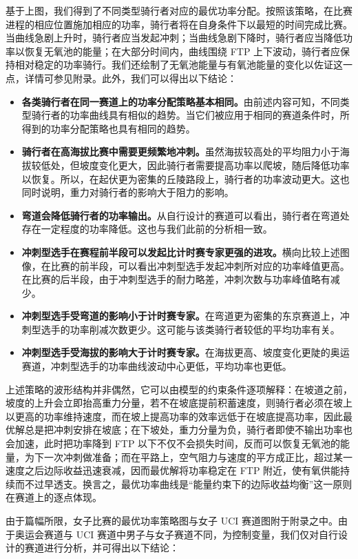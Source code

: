 \documentclass[11pt,a4paper]{ctexart}
\begin{document}
基于上图，我们得到了不同类型骑行者对应的最优功率分配。按照该策略，在比赛进程的相应位置施加相应的功率，骑行者将在自身条件下以最短的时间完成比赛。当曲线急剧上升时，骑行者应当发起冲刺；当曲线急剧下降时，骑行者应当降低功率以恢复无氧池的能量；在大部分时间内，曲线围绕 FTP 上下波动，骑行者应保持相对稳定的功率骑行。我们还绘制了无氧池能量与有氧池能量的变化以佐证这一点，详情可参见附录。此外，我们可以得出以下结论：
\begin{itemize}
\item \textbf{各类骑行者在同一赛道上的功率分配策略基本相同。}由前述内容可知，不同类型骑行者的功率曲线具有相似的趋势。当它们被应用于相同的赛道条件时，所得到的功率分配策略也具有相同的趋势。
\item \textbf{骑行者在高海拔比赛中需要更频繁地冲刺。}虽然海拔较高处的平均阻力小于海拔较低处，但坡度变化更大，因此骑行者需要提高功率以爬坡，随后降低功率以恢复。所以，在起伏更为密集的丘陵路段上，骑行者的功率波动更大。这也同时说明，重力对骑行者的影响大于阻力的影响。
\item \textbf{弯道会降低骑行者的功率输出。}从自行设计的赛道可以看出，骑行者在弯道处存在一定程度的功率降低。这也与我们此前的分析相一致。
\item \textbf{冲刺型选手在赛程前半段可以发起比计时赛专家更强的进攻。}横向比较上述图像，在比赛的前半段，可以看出冲刺型选手发起冲刺所对应的功率峰值更高。在比赛的后半段，由于冲刺型选手的耐力略差，冲刺次数与功率峰值略有减少。
\item \textbf{冲刺型选手受弯道的影响小于计时赛专家。}在弯道更为密集的东京赛道上，冲刺型选手的功率削减次数更少。这可能与该类骑行者较低的平均功率有关。
\item \textbf{冲刺型选手受海拔的影响大于计时赛专家。}在海拔更高、坡度变化更陡的奥运赛道，冲刺型选手的功率曲线波动中心更低，平均功率也更低。
\end{itemize}

上述策略的波形结构并非偶然，它可以由模型的约束条件逐项解释：在坡道之前，坡度的上升会立即抬高重力分量，若不在坡底提前积蓄速度，则骑行者必须在坡上以更高的功率维持速度，而在坡上提高功率的效率远低于在坡底提高功率，因此最优解总是把冲刺安排在坡底；在下坡处，重力分量为负，骑行者即使不输出功率也会加速，此时把功率降到 FTP 以下不仅不会损失时间，反而可以恢复无氧池的能量，为下一次冲刺做准备；而在平路上，空气阻力与速度的平方成正比，超过某一速度之后边际收益迅速衰减，因而最优解将功率稳定在 FTP 附近，使有氧供能持续而不过早透支。换言之，最优功率曲线是“能量约束下的边际收益均衡”这一原则在赛道上的逐点体现。

由于篇幅所限，女子比赛的最优功率策略图与女子 UCI 赛道图附于附录之中。由于奥运会赛道与 UCI 赛道中男子与女子赛道不同，为控制变量，我们仅对自行设计的赛道进行分析，并可得出以下结论：
\end{document}
